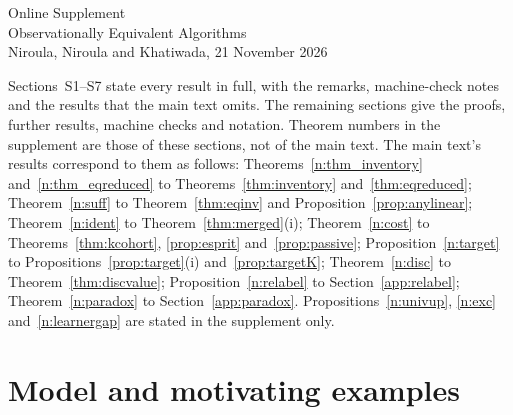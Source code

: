 \documentclass[12pt]{article}
\theoremstyle{definition}
\theoremstyle{remark}
\begin{document}
\appendix
\clearpage
\singlespacing\small\sloppy
\renewcommand{\topfraction}{0.9}\renewcommand{\bottomfraction}{0.8}\renewcommand{\textfraction}{0.07}\renewcommand{\floatpagefraction}{0.75}
\setcounter{page}{1}\setcounter{table}{0}\setcounter{figure}{0}
\begin{center}{\Large Online Supplement}\\[4pt]{\large Observationally Equivalent Algorithms}\\[2pt]{\normalsize Niroula, Niroula and Khatiwada, 21 November 2026}\end{center}

\noindent Sections~S1--S7 state every result in full, with the remarks, machine-check notes and the results that the main text omits. The remaining sections give the proofs, further results, machine checks and notation. Theorem numbers in the supplement are those of these sections, not of the main text. The main text's results correspond to them as follows: Theorems~\ref{n:thm_inventory} and~\ref{n:thm_eqreduced} to Theorems~\ref{thm:inventory} and~\ref{thm:eqreduced}; Theorem~\ref{n:suff} to Theorem~\ref{thm:eqinv} and Proposition~\ref{prop:anylinear}; Theorem~\ref{n:ident} to Theorem~\ref{thm:merged}(i); Theorem~\ref{n:cost} to Theorems~\ref{thm:kcohort}, \ref{prop:esprit} and~\ref{prop:passive}; Proposition~\ref{n:target} to Propositions~\ref{prop:target}(i) and~\ref{prop:targetK}; Theorem~\ref{n:disc} to Theorem~\ref{thm:discvalue}; Proposition~\ref{n:relabel} to Section~\ref{app:relabel}; Theorem~\ref{n:paradox} to Section~\ref{app:paradox}. Propositions~\ref{n:univup}, \ref{n:exc} and~\ref{n:learnergap} are stated in the supplement only.

\section{Model and motivating examples}\label{sec:model}
\end{document}
